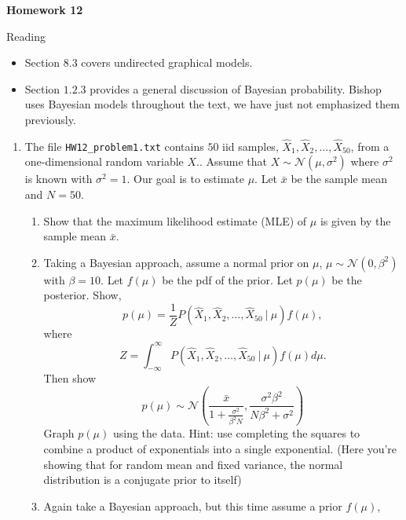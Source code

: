 \documentclass{article}
\begin{document}
\large

\begin{center}
\textbf{Homework  12} \\  
\end{center}

\normalsize

Reading
\begin{itemize}
\item Section $8.3$ covers undirected graphical models.
\item Section $1.2.3$ provides a general discussion of Bayesian probability.  Bishop uses Bayesian models throughout the text, we have just not emphasized them previously.
\end{itemize}

\begin{enumerate}
\item The file \verb+HW12_problem1.txt+ contains $50$ iid samples, $\hat{X}_1, \hat{X}_2,\dots, \hat{X}_{50}$, from a one-dimensional random variable $X$..  Assume that $X \sim \mathcal{N}(\mu, \sigma^2)$ where $\sigma^2$ is known with $\sigma^2 = 1$.  Our goal is to estimate $\mu$.   Let $\bar{x}$ be the sample mean and $N=50$.
\begin{enumerate}
\item Show that the maximum likelihood estimate (MLE) of $\mu$ is given by the sample mean $\bar{x}$.
\item Taking a Bayesian approach, assume a normal prior on $\mu$, $\mu \sim \mathcal{N}(0, \beta^2)$ with $\beta = 10$.  Let $f(\mu)$ be the pdf of the prior.  Let $p(\mu)$ be the posterior.   Show,
\begin{equation}
p(\mu) = \frac{1}{Z} P(\hat{X}_1, \hat{X}_2,\dots, \hat{X}_{50} \  | \ \mu) f(\mu),
\end{equation}
where
\begin{equation}
Z = \int_{-\infty}^\infty P(\hat{X}_1, \hat{X}_2,\dots, \hat{X}_{50} \ | \ \mu) f(\mu) d\mu.
\end{equation}
Then show
\begin{equation}
p(\mu) \sim \mathcal{N}(\frac{\bar{x}}{1 + \frac{\sigma^2}{\beta^2N}}, \frac{\sigma^2 \beta^2}{N\beta^2 + \sigma^2})
\end{equation}
Graph $p(\mu)$ using the data.
Hint:  use completing the squares to combine a product of exponentials into a single exponential.
(Here you're showing that for random mean and fixed variance, the normal distribution is a conjugate prior to itself)
\item Again take a Bayesian approach, but this time assume a prior $f(\mu)$,

\end{enumerate}
\end{enumerate}
\end{document}
